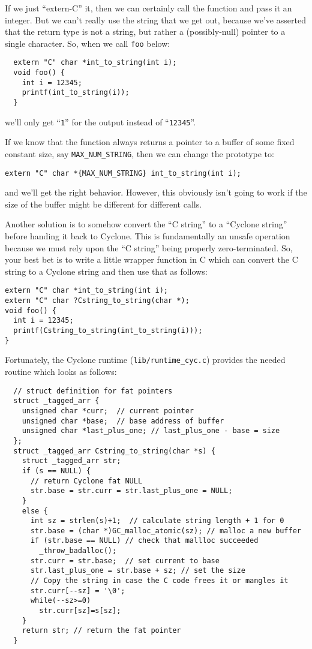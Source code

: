 If we just ``extern-C'' it, then we can certainly call the function
and pass it an integer.  But we can't really use the string
that we get out, because we've asserted that the return type
is not a string, but rather a (possibly-null) pointer to a single
character.  So, when we call \texttt{foo} below:
\begin{verbatim}
  extern "C" char *int_to_string(int i);
  void foo() {
    int i = 12345;
    printf(int_to_string(i));
  }
\end{verbatim}
we'll only get ``\texttt{1}'' for the output instead of
``\texttt{12345}''.  

If we know that the function always returns a pointer to a buffer of 
some fixed constant size, say \texttt{MAX\_NUM\_STRING}, then
we can change the prototype to:
\begin{verbatim}
extern "C" char *{MAX_NUM_STRING} int_to_string(int i);
\end{verbatim}
and we'll get the right behavior.  However, this obviously isn't
going to work if the size of the buffer might be different for
different calls.  

Another solution is to somehow convert the ``C string'' to a ``Cyclone
string'' before handing it back to Cyclone.  This is fundamentally
an unsafe operation because we must rely upon the ``C string'' being
properly zero-terminated.  So, your best bet is to write a little
wrapper function in C which can convert the C string to a Cyclone
string and then use that as follows:
\begin{verbatim}
extern "C" char *int_to_string(int i);
extern "C" char ?Cstring_to_string(char *);
void foo() {
  int i = 12345;
  printf(Cstring_to_string(int_to_string(i)));
}
\end{verbatim}

Fortunately, the Cyclone runtime (\texttt{lib/runtime\_cyc.c}) 
provides the needed routine which looks as follows:
\begin{verbatim}
  // struct definition for fat pointers
  struct _tagged_arr {
    unsigned char *curr;  // current pointer
    unsigned char *base;  // base address of buffer
    unsigned char *last_plus_one; // last_plus_one - base = size
  };
  struct _tagged_arr Cstring_to_string(char *s) {
    struct _tagged_arr str;
    if (s == NULL) {
      // return Cyclone fat NULL
      str.base = str.curr = str.last_plus_one = NULL;
    }
    else {
      int sz = strlen(s)+1;  // calculate string length + 1 for 0
      str.base = (char *)GC_malloc_atomic(sz); // malloc a new buffer
      if (str.base == NULL) // check that mallloc succeeded
        _throw_badalloc();
      str.curr = str.base;  // set current to base
      str.last_plus_one = str.base + sz; // set the size
      // Copy the string in case the C code frees it or mangles it
      str.curr[--sz] = '\0';
      while(--sz>=0)
        str.curr[sz]=s[sz];
    }
    return str; // return the fat pointer
  }
\end{verbatim}

